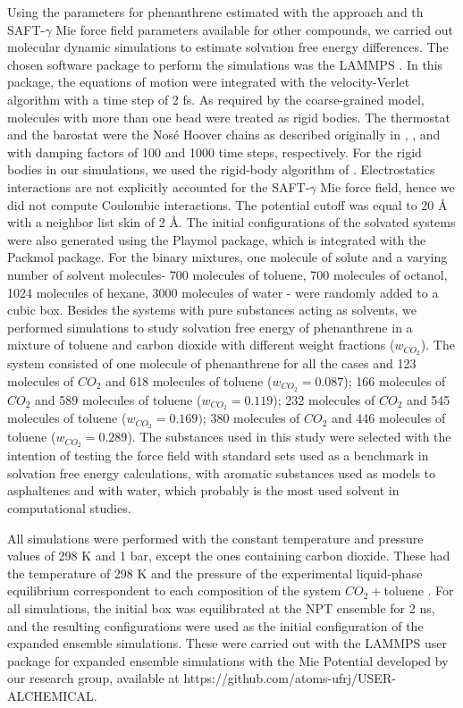 Using the parameters for phenanthrene estimated with the  approach and th SAFT-$\gamma$ Mie force field parameters available for other compounds, we carried out molecular dynamic simulations to estimate solvation free energy differences. The chosen software package to perform the simulations was the LAMMPS  \cite{lammps}. In this package, the equations of motion were integrated with the velocity-Verlet algorithm \cite{verlet} with a time step of 2 fs. As required by the coarse-grained model,  molecules with more than one bead were treated as rigid bodies. The thermostat and the barostat were the Nos\'{e} Hoover chains as described originally in , , and  with damping factors of 100 and 1000 time steps, respectively. For the rigid bodies in our simulations, we used the rigid-body algorithm of . Electrostatics interactions are not explicitly accounted for the SAFT-$\gamma$ Mie force field, hence we did not compute Coulombic interactions. The potential cutoff was equal to 20 \AA $\,$ \cite{muller2017} with a neighbor list skin of 2 \AA. The initial configurations of the solvated systems were also generated using the Playmol package, which is integrated with the Packmol package. For the binary mixtures, one molecule of solute and a varying number of solvent molecules- 700 molecules of toluene, 700 molecules of octanol, 1024 molecules of hexane, 3000 molecules of water - were randomly added to a cubic box. Besides the systems with pure substances acting as solvents, we performed simulations to study solvation free energy of phenanthrene in a mixture of toluene and carbon dioxide with different weight fractions ($w_{CO_{2}}$). The  system consisted of one molecule of phenanthrene for all the cases and 123 molecules of $CO_{2}$ and 618 molecules of toluene ($w_{CO_{2}} = 0.087$); 166 molecules of $CO_{2}$ and 589 molecules of toluene ($w_{CO_{2}} = 0.119$); 232 molecules of $CO_{2}$ and 545 molecules of toluene ($w_{CO_{2}} = 0.169)$; 380 molecules of $CO_{2}$ and 446 molecules of toluene ($w_{CO_{2}} = 0.289$). The substances used in this study were selected with the intention of testing the force field with standard sets used as a benchmark in solvation free energy calculations, with aromatic substances used as models to asphaltenes and with water, which probably is the most used solvent in computational studies.

All simulations were performed with the constant temperature and pressure values of 298 K and 1 bar, except the ones containing carbon dioxide. These had the temperature of 298 K and the pressure of the experimental liquid-phase equilibrium correspondent to each composition of the system $CO_{2}+$toluene \cite{co2toliq}. For all simulations, the initial box was equilibrated at the NPT ensemble for 2 ns, and the resulting configurations were used as the initial configuration of the expanded ensemble simulations. These were carried out with the LAMMPS user package for expanded ensemble simulations with the Mie Potential developed by our research group, available at https://github.com/atoms-ufrj/USER-ALCHEMICAL. 


